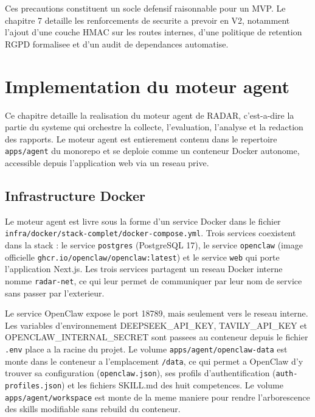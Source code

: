 \documentclass[12pt,a4paper,openany]{report}
\begin{document}
Ces precautions constituent un socle defensif raisonnable pour un MVP. Le chapitre 7 detaille les renforcements de securite a prevoir en V2, notamment l'ajout d'une couche HMAC sur les routes internes, d'une politique de retention RGPD formalisee et d'un audit de dependances automatise.

\chapter{Implementation du moteur agent}
\label{chap:moteur-agent}

Ce chapitre detaille la realisation du moteur agent de RADAR, c'est-a-dire la partie du systeme qui orchestre la collecte, l'evaluation, l'analyse et la redaction des rapports. Le moteur agent est entierement contenu dans le repertoire \texttt{apps/agent} du monorepo et se deploie comme un conteneur Docker autonome, accessible depuis l'application web via un reseau prive.

\section{Infrastructure Docker}
\label{sec:infra-docker}

Le moteur agent est livre sous la forme d'un service Docker dans le fichier \texttt{infra/docker/stack-complet/docker-compose.yml}. Trois services coexistent dans la stack : le service \texttt{postgres} (PostgreSQL 17), le service \texttt{openclaw} (image officielle \texttt{ghcr.io/openclaw/openclaw:latest}) et le service \texttt{web} qui porte l'application Next.js. Les trois services partagent un reseau Docker interne nomme \texttt{radar-net}, ce qui leur permet de communiquer par leur nom de service sans passer par l'exterieur.

Le service OpenClaw expose le port 18789, mais seulement vers le reseau interne. Les variables d'environnement DEEPSEEK\_API\_KEY, TAVILY\_API\_KEY et OPENCLAW\_INTERNAL\_SECRET sont passees au conteneur depuis le fichier \texttt{.env} place a la racine du projet. Le volume \texttt{apps/agent/openclaw-data} est monte dans le conteneur a l'emplacement \texttt{/data}, ce qui permet a OpenClaw d'y trouver sa configuration (\texttt{openclaw.json}), ses profils d'authentification (\texttt{auth-profiles.json}) et les fichiers SKILL.md des huit competences. Le volume \texttt{apps/agent/workspace} est monte de la meme maniere pour rendre l'arborescence des skills modifiable sans rebuild du conteneur.
\end{document}
